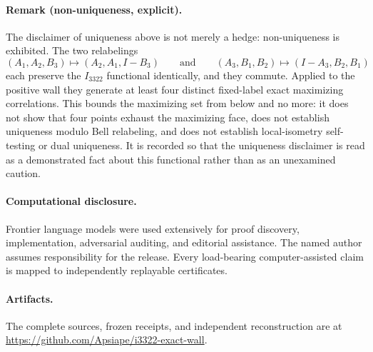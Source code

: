 \documentclass[11pt]{article}
\begin{document}
\paragraph{Remark (non-uniqueness, explicit).}
The disclaimer of uniqueness above is not merely a hedge: non-uniqueness is
exhibited.  The two relabelings
\[
(A_1,A_2,B_3)\mapsto(A_2,A_1,I-B_3)
\qquad\text{and}\qquad
(A_3,B_1,B_2)\mapsto(I-A_3,B_2,B_1)
\]
each preserve the $I_{3322}$ functional identically, and they commute.
Applied to the positive wall they generate at least four distinct fixed-label
exact maximizing correlations.  This bounds the maximizing set from below and
no more: it does not show that four points exhaust the maximizing face, does
not establish uniqueness modulo Bell relabeling, and does not establish
local-isometry self-testing or dual uniqueness.  It is recorded so that the
uniqueness disclaimer is read as a demonstrated fact about this functional
rather than as an unexamined caution.

\paragraph{Computational disclosure.}
Frontier language models were used extensively for proof discovery,
implementation, adversarial auditing, and editorial assistance.  The named
author assumes responsibility for the release.  Every load-bearing
computer-assisted claim is mapped to independently replayable certificates.

\paragraph{Artifacts.}
The complete sources, frozen receipts, and independent reconstruction are at
\url{https://github.com/Apsiape/i3322-exact-wall}.

\begingroup
\footnotesize


\endgroup
\end{document}
